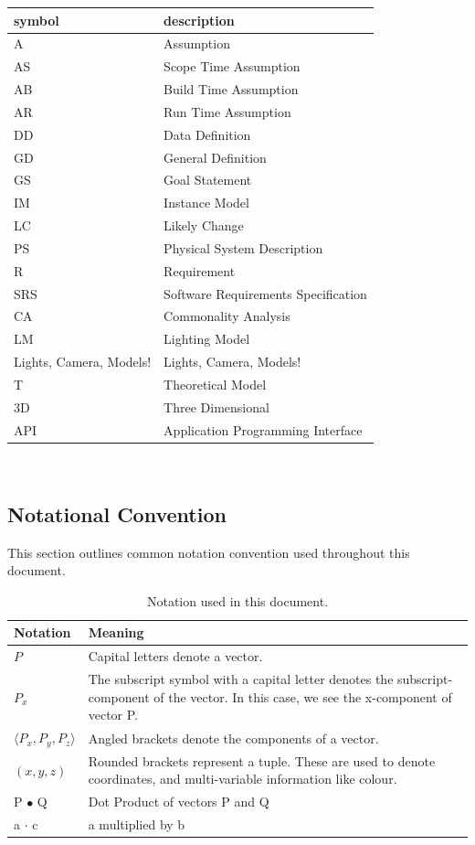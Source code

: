 \documentclass[12pt]{article}
\newcommand{\famname}{Lights, Camera, Models!} %
\begin{document}
\renewcommand{\arraystretch}{1.2}
\begin{tabular}{l l} 
	\toprule		
	\textbf{symbol} & \textbf{description}\\
	\midrule 
	A & Assumption\\
	AS & Scope Time Assumption \\
	AB & Build Time Assumption \\
	AR & Run Time Assumption \\
	DD & Data Definition\\
	GD & General Definition\\
	GS & Goal Statement\\
	IM & Instance Model\\
	LC & Likely Change\\
	PS & Physical System Description\\
	R & Requirement\\
	SRS & Software Requirements Specification\\
	CA & Commonality Analysis \\
	LM & Lighting Model\\
	\famname{} & \famname{}\\
	T & Theoretical Model\\
	3D & Three Dimensional \\
	API & Application Programming Interface \\
	\bottomrule
\end{tabular}\\


\subsection{Notational Convention}
\label{sec:notation}
This section outlines common notation convention used throughout this document.

\begin{table}[H]
	\begin{tabular}{|l|p{15cm}|}
		\hline
		\textbf{Notation} & \textbf{Meaning} \\
		\hline
		$P$ & Capital letters denote a vector. \\
		\hline
		$P_{x}$ & The subscript symbol with a capital letter denotes the 
		subscript-component of the vector. In this case, we see the x-component 
		of vector P. \\
		\hline		
		$\langle P_{x}, P_{y}, P_{z} \rangle$ & Angled brackets denote the 
		components of a vector. \\
		\hline
		$(x, y, z)$ & Rounded brackets represent a tuple. These are used to 
		denote coordinates, and multi-variable information like colour. \\
		\hline
		P $\bullet$ Q & Dot Product of vectors P and Q\\
		\hline
		a $\cdot$ c & a multiplied by b \\
		\hline
	\end{tabular}
	\caption{Notation used in this document.}
	\label{tbl:notation-convention}
\end{table}
\end{document}
